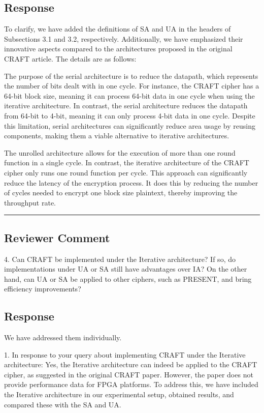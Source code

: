 \subsection{Response}

To clarify, we have added the definitions of SA and UA in the headers of Subsections 3.1 and 3.2, respectively. Additionally, we have emphasized their innovative aspects compared to the architectures proposed in the original CRAFT article. The details are as follows:

\color{blue}
The purpose of the serial architecture is to reduce the datapath, which represents the number of bits dealt with in one cycle. For instance, the CRAFT cipher has a 64-bit block size, meaning it can process 64-bit data in one cycle when using the iterative architecture. In contrast, the serial architecture reduces the datapath from 64-bit to 4-bit, meaning it can only process 4-bit data in one cycle. Despite this limitation, serial architectures can significantly reduce area usage by reusing components, making them a viable alternative to iterative architectures.

The unrolled architecture allows for the execution of more than one round function in a single cycle. In contrast, the iterative architecture of the CRAFT cipher only runs one round function per cycle. This approach can significantly reduce the latency of the encryption process. It does this by reducing the number of cycles needed to encrypt one block size plaintext, thereby improving the throughput rate.
\color{black}

\noindent\rule{\linewidth}{2.0pt}

\subsection{Reviewer Comment}
4. Can CRAFT be implemented under the Iterative architecture? If so, do implementations under UA or SA still have advantages over IA? On the other hand, can UA or SA be applied to other ciphers, such as PRESENT, and bring efficiency improvements?

\subsection{Response}

We have addressed them individually. 

1. In response to your query about implementing CRAFT under the Iterative architecture: Yes, the Iterative architecture can indeed be applied to the CRAFT cipher, as suggested in the original CRAFT paper. However, the paper does not provide performance data for FPGA platforms. To address this, we have included the Iterative architecture in our experimental setup, obtained results, and compared these with the SA and UA.

